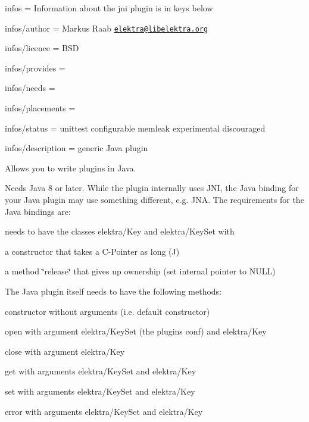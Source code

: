 
\begin{DoxyItemize}
\item infos = Information about the jni plugin is in keys below
\item infos/author = Markus Raab \href{mailto:elektra@libelektra.org}{\tt elektra@libelektra.\+org}
\item infos/licence = B\+SD
\item infos/provides =
\item infos/needs =
\item infos/placements =
\item infos/status = unittest configurable memleak experimental discouraged
\item infos/description = generic Java plugin
\end{DoxyItemize}

Allows you to write plugins in Java.

Needs Java 8 or later. While the plugin internally uses J\+NI, the Java binding for your Java plugin may use something different, e.\+g. J\+NA. The requirements for the Java bindings are\+:


\begin{DoxyItemize}
\item needs to have the classes {\ttfamily elektra/\+Key} and {\ttfamily elektra/\+Key\+Set} with
\begin{DoxyItemize}
\item a constructor that takes a C-\/\+Pointer as long (J)
\item a method \char`\"{}release\char`\"{} that gives up ownership (set internal pointer to N\+U\+LL)
\end{DoxyItemize}
\end{DoxyItemize}

The Java plugin itself needs to have the following methods\+:


\begin{DoxyItemize}
\item constructor without arguments (i.\+e. default constructor)
\item open with argument {\ttfamily elektra/\+Key\+Set} (the plugin\textquotesingle{}s conf) and {\ttfamily elektra/\+Key}
\item close with argument {\ttfamily elektra/\+Key}
\item get with arguments {\ttfamily elektra/\+Key\+Set} and {\ttfamily elektra/\+Key}
\item set with arguments {\ttfamily elektra/\+Key\+Set} and {\ttfamily elektra/\+Key}
\item error with arguments {\ttfamily elektra/\+Key\+Set} and {\ttfamily elektra/\+Key}
\end{DoxyItemize}

